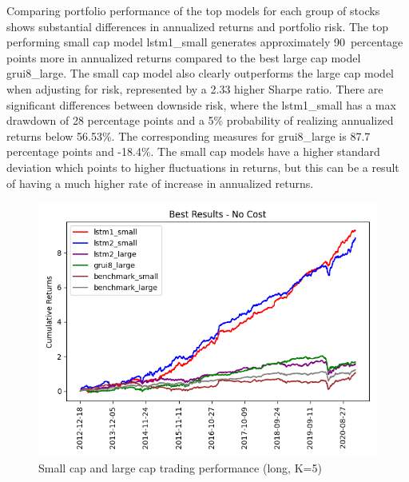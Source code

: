Comparing portfolio performance of the top models for each group of stocks shows substantial differences in annualized returns and portfolio risk. The top performing small cap model lstm1\_small generates approximately 90\ percentage points more in annualized returns compared to the best large cap model grui8\_large. The small cap model also clearly outperforms the large cap model when adjusting for risk, represented by a 2.33 higher Sharpe ratio. There are significant differences between downside risk, where the lstm1\_small has a max drawdown of 28 percentage points and a 5\% probability of realizing annualized returns below 56.53\%. The corresponding measures for grui8\_large is 87.7 percentage points and -18.4\%. The small cap models have a higher standard deviation which points to higher fluctuations in returns, but this can be a result of having a much higher rate of increase in annualized returns. 

\indent\newline 
\begin{figure}[H]
\centering
\includegraphics [scale=0.60,angle=360]{figures/cumulative_best_mix_cap_return_no_cost.png}
\caption{Small cap and large cap trading performance (long, K=5)}
\label{fig:mixtrading}
\end{figure}

